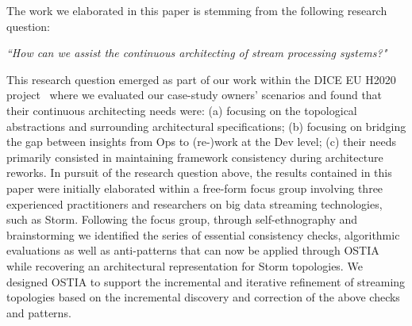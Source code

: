 
The work we elaborated in this paper is stemming from the following research question:

\begin{center}
\emph{``How can we assist the continuous architecting of stream processing systems?"}
\end{center}

This research question emerged as part of our work within the DICE EU H2020 project~\cite{dice2020}
where we evaluated our case-study owners' scenarios and found that their continuous architecting needs were: (a) focusing on the topological abstractions and surrounding architectural specifications; (b) focusing on bridging the gap between insights from Ops to (re-)work at the Dev level; (c) their needs primarily consisted in maintaining framework consistency during architecture reworks.
In pursuit of the research question above, the results contained in this paper were initially elaborated within a free-form focus group \cite{focusgroup} involving three experienced practitioners and researchers on big data streaming technologies, such as Storm. Following the focus group, through self-ethnography \cite{selfeth} and brainstorming we identified the series of essential consistency checks, algorithmic evaluations as well as anti-patterns that can now be applied through OSTIA while recovering an architectural representation for Storm topologies. We designed OSTIA
to support the incremental and iterative refinement of streaming topologies based on the incremental discovery and correction of the above checks and patterns.


